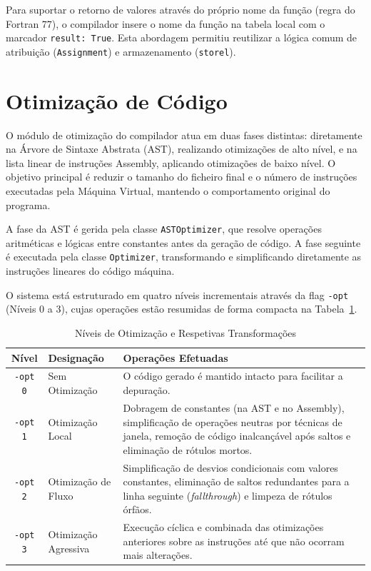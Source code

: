\documentclass[12pt, a4paper]{article}
\begin{document}
Para suportar o retorno de valores através do próprio nome da função (regra do Fortran 77), o compilador insere o nome da função na tabela local com o marcador \texttt{result: True}. Esta abordagem permitiu reutilizar a lógica comum de atribuição (\texttt{Assignment}) e armazenamento (\texttt{storel}).
\section{Otimização de Código}
O módulo de otimização do compilador atua em duas fases distintas: diretamente na Árvore de Sintaxe Abstrata (AST), realizando otimizações de alto nível, e na lista linear de instruções Assembly, aplicando otimizações de baixo nível. O objetivo principal é reduzir o tamanho do ficheiro final e o número de instruções executadas pela Máquina Virtual, mantendo o comportamento original do programa.

A fase da AST é gerida pela classe \texttt{ASTOptimizer}, que resolve operações aritméticas e lógicas entre constantes antes da geração de código. A fase seguinte é executada pela classe \texttt{Optimizer}, transformando e simplificando diretamente as instruções lineares do código máquina.

O sistema está estruturado em quatro níveis incrementais através da flag \texttt{-opt} (Níveis 0 a 3), cujas operações estão resumidas de forma compacta na Tabela~\ref{tab:optimization_levels}.

\begin{table}[h!]
\centering
\caption{Níveis de Otimização e Respetivas Transformações}
\label{tab:optimization_levels}
\begin{tabular}{clp{8.5cm}}
\toprule
\textbf{Nível} & \textbf{Designação} & \textbf{Operações Efetuadas} \\ \midrule
\texttt{-opt 0} & Sem Otimização & O código gerado é mantido intacto para facilitar a depuração. \\ \midrule
\texttt{-opt 1} & Otimização Local & Dobragem de constantes (na AST e no Assembly), simplificação de operações neutras por técnicas de janela, remoção de código inalcançável após saltos e eliminação de rótulos mortos. \\ \midrule
\texttt{-opt 2} & Otimização de Fluxo & Simplificação de desvios condicionais com valores constantes, eliminação de saltos redundantes para a linha seguinte (\textit{fallthrough}) e limpeza de rótulos órfãos. \\ \midrule
\texttt{-opt 3} & Otimização Agressiva & Execução cíclica e combinada das otimizações anteriores sobre as instruções até que não ocorram mais alterações. \\ \bottomrule
\end{tabular}
\end{table}
\end{document}
